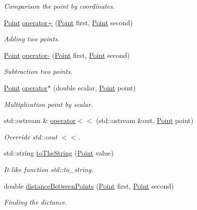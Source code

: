 \begin{DoxyCompactItemize}
\begin{DoxyCompactList}\small\item\em Comparison the point by coordinates. \end{DoxyCompactList}\item 
\mbox{\hyperlink{structtdp_1_1_point}{Point}} \mbox{\hyperlink{namespacetdp_a34cf3e1ef508e6a115b6c1d24a5dbb5d}{operator+}} (\mbox{\hyperlink{structtdp_1_1_point}{Point}} first, \mbox{\hyperlink{structtdp_1_1_point}{Point}} second)
\begin{DoxyCompactList}\small\item\em Adding two points. \end{DoxyCompactList}\item 
\mbox{\hyperlink{structtdp_1_1_point}{Point}} \mbox{\hyperlink{namespacetdp_ab8dc4a4b6272d3a8ef06f22a5b07daec}{operator-\/}} (\mbox{\hyperlink{structtdp_1_1_point}{Point}} first, \mbox{\hyperlink{structtdp_1_1_point}{Point}} second)
\begin{DoxyCompactList}\small\item\em Subtraction two points. \end{DoxyCompactList}\item 
\mbox{\hyperlink{structtdp_1_1_point}{Point}} \mbox{\hyperlink{namespacetdp_a291c69f1bd3cf68f5c2b68fc3ab37f3a}{operator$\ast$}} (double scalar, \mbox{\hyperlink{structtdp_1_1_point}{Point}} point)
\begin{DoxyCompactList}\small\item\em Multiplication point by scalar. \end{DoxyCompactList}\item 
std\+::ostream \& \mbox{\hyperlink{namespacetdp_a40a6deb04f2cc708b0cd33955e23ffb6}{operator$<$$<$}} (std\+::ostream \&out, \mbox{\hyperlink{structtdp_1_1_point}{Point}} point)
\begin{DoxyCompactList}\small\item\em Override std\+::cout $<$$<$. \end{DoxyCompactList}\item 
std\+::string \mbox{\hyperlink{namespacetdp_ade7149690123950b10455ece39159e94}{to\+The\+String}} (\mbox{\hyperlink{structtdp_1_1_point}{Point}} value)
\begin{DoxyCompactList}\small\item\em It like function std\+::to\+\_\+string. \end{DoxyCompactList}\item 
double \mbox{\hyperlink{namespacetdp_a05b1894339c9a02c1e9347d3dd6fd07a}{distance\+Between\+Points}} (\mbox{\hyperlink{structtdp_1_1_point}{Point}} first, \mbox{\hyperlink{structtdp_1_1_point}{Point}} second)
\begin{DoxyCompactList}\small\item\em Finding the dictance. \end{DoxyCompactList}\end{DoxyCompactItemize}


